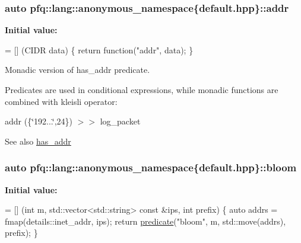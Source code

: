 \subsubsection[{\texorpdfstring{addr}{addr}}]{\setlength{\rightskip}{0pt plus 5cm}auto pfq\+::lang\+::anonymous\+\_\+namespace\{default.\+hpp\}\+::addr}\hypertarget{namespacepfq_1_1lang_1_1anonymous__namespace_02default_8hpp_03_a13cabe468839119d8d68540e3c60718b}{}\label{namespacepfq_1_1lang_1_1anonymous__namespace_02default_8hpp_03_a13cabe468839119d8d68540e3c60718b}
{\bfseries Initial value\+:}
\begin{DoxyCode}
= [] (CIDR data)
        \{
            \textcolor{keywordflow}{return} \textcolor{keyword}{function}(\textcolor{stringliteral}{"addr"}, data);
        \}
\end{DoxyCode}


Monadic version of {\ttfamily has\+\_\+addr} predicate. 

Predicates are used in conditional expressions, while monadic functions are combined with kleisli operator\+:

addr (\{\char`\"{}192...\char`\"{},24\}) $>$$>$ log\+\_\+packet

\begin{DoxySeeAlso}{See also}
\hyperlink{namespacepfq_1_1lang_1_1anonymous__namespace_02default_8hpp_03_a74c6b7e812fb3d312ebf534960a6a91d}{has\+\_\+addr} 
\end{DoxySeeAlso}
\subsubsection[{\texorpdfstring{bloom}{bloom}}]{\setlength{\rightskip}{0pt plus 5cm}auto pfq\+::lang\+::anonymous\+\_\+namespace\{default.\+hpp\}\+::bloom}\hypertarget{namespacepfq_1_1lang_1_1anonymous__namespace_02default_8hpp_03_abfcd230137acb93cfd99f7a0a7c1f17f}{}\label{namespacepfq_1_1lang_1_1anonymous__namespace_02default_8hpp_03_abfcd230137acb93cfd99f7a0a7c1f17f}
{\bfseries Initial value\+:}
\begin{DoxyCode}
= [] (\textcolor{keywordtype}{int} m, std::vector<std::string> \textcolor{keyword}{const} &ips, \textcolor{keywordtype}{int} prefix) \{
                                \textcolor{keyword}{auto} addrs = fmap(details::inet\_addr, ips);
                                \textcolor{keywordflow}{return} \hyperlink{namespacepfq_1_1lang_aca9adafc436b7f851621b979fa1aaf88}{predicate}(\textcolor{stringliteral}{"bloom"}, m, std::move(addrs), prefix);
                          \}
\end{DoxyCode}



